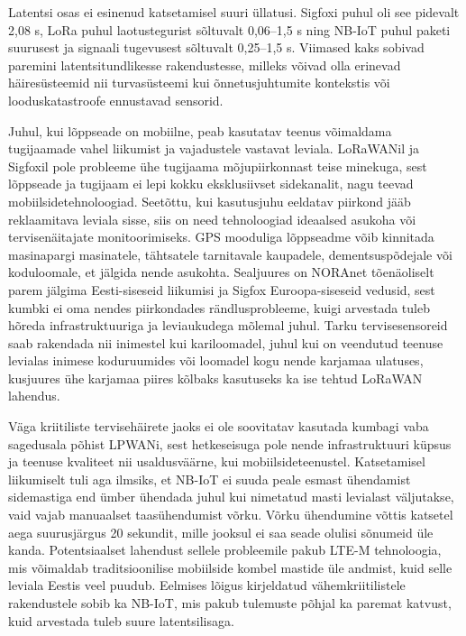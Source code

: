 \documentclass[12pt]{article}
\begin{document}
    Latentsi osas ei esinenud katsetamisel suuri üllatusi.
    Sigfoxi puhul oli see pidevalt 2,08 s, LoRa puhul laotustegurist sõltuvalt 0,06--1,5 s ning NB-IoT puhul paketi suurusest ja signaali tugevusest sõltuvalt 0,25--1,5 s.
    Viimased kaks sobivad paremini latentsitundlikesse rakendustesse, milleks võivad olla erinevad häiresüsteemid nii turvasüsteemi kui õnnetusjuhtumite kontekstis või looduskatastroofe ennustavad sensorid.

    Juhul, kui lõppseade on mobiilne, peab kasutatav teenus võimaldama tugijaamade vahel liikumist ja vajadustele vastavat leviala.
    LoRaWANil ja Sigfoxil pole probleeme ühe tugijaama mõjupiirkonnast teise minekuga, sest lõppseade ja tugijaam ei lepi kokku eksklusiivset sidekanalit, nagu teevad mobiilsidetehnoloogiad.
    Seetõttu, kui kasutusjuhu eeldatav piirkond jääb reklaamitava leviala sisse, siis on need tehnoloogiad ideaalsed asukoha või tervisenäitajate monitoorimiseks.
    GPS mooduliga lõppseadme võib kinnitada masinapargi masinatele, tähtsatele tarnitavale kaupadele, dementsuspõdejale või koduloomale, et jälgida nende asukohta.
    Sealjuures on NORAnet tõenäoliselt parem jälgima Eesti-siseseid liikumisi ja Sigfox Euroopa-siseseid vedusid, sest kumbki ei oma nendes piirkondades rändlusprobleeme, kuigi arvestada tuleb hõreda infrastruktuuriga ja leviaukudega mõlemal juhul.
    Tarku tervisesensoreid saab rakendada nii inimestel kui kariloomadel, juhul kui on veendutud teenuse levialas inimese koduruumides või loomadel kogu nende karjamaa ulatuses, kusjuures ühe karjamaa piires kõlbaks kasutuseks ka ise tehtud LoRaWAN lahendus.

    Väga kriitiliste tervisehäirete jaoks ei ole soovitatav kasutada kumbagi vaba sagedusala põhist LPWANi, sest hetkeseisuga pole nende infrastruktuuri küpsus ja teenuse kvaliteet nii usaldusväärne, kui mobiilsideteenustel.
    Katsetamisel liikumiselt tuli aga ilmsiks, et NB-IoT ei suuda peale esmast ühendamist sidemastiga end ümber ühendada juhul kui nimetatud masti levialast väljutakse, vaid vajab manuaalset taasühendumist võrku.
    Võrku ühendumine võttis katsetel aega suurusjärgus 20 sekundit, mille jooksul ei saa seade olulisi sõnumeid üle kanda.
    Potentsiaalset lahendust sellele probleemile pakub LTE-M tehnoloogia, mis võimaldab traditsioonilise mobiilside kombel mastide üle andmist, kuid selle leviala Eestis veel puudub.
    Eelmises lõigus kirjeldatud vähemkriitilistele rakendustele sobib ka NB-IoT, mis pakub tulemuste põhjal ka paremat katvust, kuid arvestada tuleb suure latentsilisaga.
\end{document}
